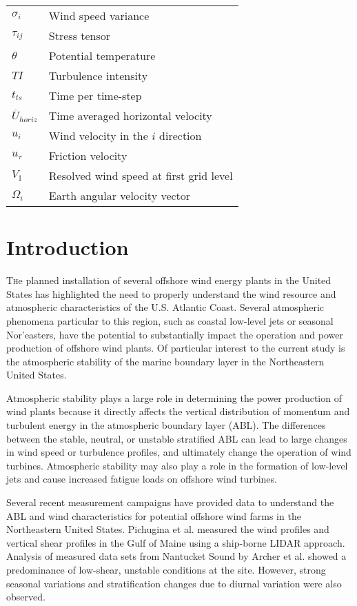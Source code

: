 \documentclass[conf]{new-aiaa}
\begin{document}
{\begin{longtable*}{@{}l @{\quad=\quad} l@{}}
$\sigma_i$ & Wind speed variance \\
$\tau_{ij}$ & Stress tensor \\
$\theta$  & Potential temperature \\
$TI$      & Turbulence intensity \\
$t_{ts}$  & Time per time-step \\
$\overline{U}_{horiz}$ & Time averaged horizontal velocity \\
$u_i$     & Wind velocity in the $i$ direction  \\
$u_\tau$   & Friction velocity    \\
$V_1$     & Resolved wind speed at first grid level \\
$\Omega_i$ & Earth angular velocity vector
\end{longtable*}}

\section{Introduction}

\lettrine{T}he planned installation of several offshore wind energy
plants in the United States has highlighted the need to properly
understand the wind resource and atmospheric characteristics of the U.S.
Atlantic Coast.  Several atmospheric phenomena particular to this
region, such as coastal low-level jets or seasonal Nor’easters, have
the potential to substantially impact the operation and power
production of offshore wind plants.  Of particular interest to the
current study is the atmospheric stability of the marine boundary
layer in the Northeastern United States.

Atmospheric stability plays a large role in determining the power
production of wind plants because it directly affects the vertical
distribution of momentum and turbulent energy in the atmospheric
boundary layer (ABL).  The differences between the stable, neutral, or
unstable stratified ABL can lead to large changes in wind speed or
turbulence profiles, and ultimately change the operation of wind
turbines.  Atmospheric stability may also play a role in the formation
of low-level jets \cite{nunalee2014mesoscale} and cause increased
fatigue loads on offshore wind turbines.

Several recent measurement campaigns have provided data to understand
the ABL and wind characteristics for potential offshore wind farms in
the Northeastern United States.  Pichugina et al. \cite{pichugina2017properties}
measured the wind profiles and vertical shear profiles in the Gulf of
Maine using a ship-borne LIDAR approach.  Analysis of measured data
sets from Nantucket Sound by Archer et
al. \cite{archer2016predominance} showed a predominance of low-shear,
unstable conditions at the site.  However, strong seasonal variations
and stratification changes due to diurnal variation were also
observed.
\end{document}

